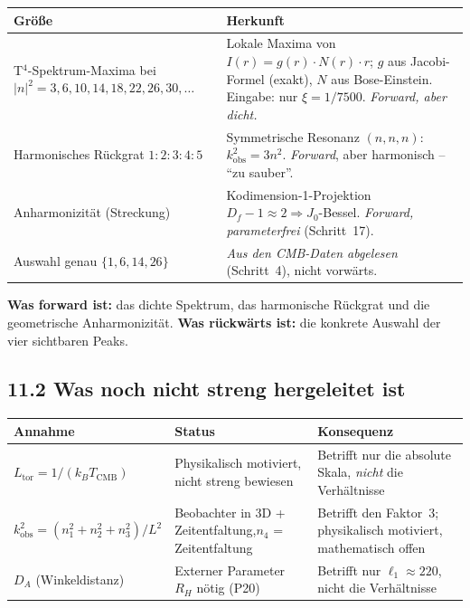 \begin{center}
\begin{tabular}{p{4cm}p{8cm}}
\toprule
\textbf{Größe} & \textbf{Herkunft} \\
\midrule
T$^4$-Spektrum-Maxima bei \newline $|n|^2 = 3,6,10,14,18,22,26,30,\ldots$ &
  Lokale Maxima von $I(r) = g(r)\cdot N(r)\cdot r$;
  $g$ aus Jacobi-Formel (exakt), $N$ aus Bose-Einstein.
  Eingabe: nur $\xi = 1/7500$. \emph{Forward, aber dicht.} \\
\addlinespace
Harmonisches Rückgrat $1:2:3:4:5$ &
  Symmetrische Resonanz $(n,n,n)$: $k^2_\mathrm{obs}=3n^2$.
  \emph{Forward}, aber harmonisch -- ``zu sauber''. \\
\addlinespace
Anharmonizität (Streckung) &
  Kodimension-1-Projektion $D_f-1\approx2 \Rightarrow J_0$-Bessel.
  \emph{Forward, parameterfrei} (Schritt~17). \\
\addlinespace
Auswahl genau $\{1,6,14,26\}$ &
  \emph{Aus den CMB-Daten abgelesen} (Schritt~4), nicht vorwärts. \\
\bottomrule
\end{tabular}
\end{center}

\textbf{Was forward ist:} das dichte Spektrum, das harmonische Rückgrat
und die geometrische Anharmonizität. \textbf{Was rückwärts ist:} die
konkrete Auswahl der vier sichtbaren Peaks.

\subsection*{11.2 Was noch nicht streng hergeleitet ist}

\begin{center}
\begin{tabular}{p{4cm}p{4cm}p{4cm}}
\toprule
\textbf{Annahme} & \textbf{Status} & \textbf{Konsequenz} \\
\midrule
$L_\mathrm{tor} = 1/(k_BT_\mathrm{CMB})$ &
  Physikalisch motiviert, nicht streng bewiesen &
  Betrifft nur die absolute Skala, \emph{nicht} die Verhältnisse \\
\addlinespace
$k_\mathrm{obs}^2 = (n_1^2+n_2^2+n_3^2)/L^2$ &
  Beobachter in 3D + Zeitentfaltung,\newline $n_4$ = Zeitentfaltung &
  Betrifft den Faktor~3; physikalisch motiviert, mathematisch offen \\
\addlinespace
$D_A$ (Winkeldistanz) &
  Externer Parameter $R_H$ nötig (P20) &
  Betrifft nur $\ell_1 \approx 220$, nicht die Verhältnisse \\
\bottomrule
\end{tabular}
\end{center}

